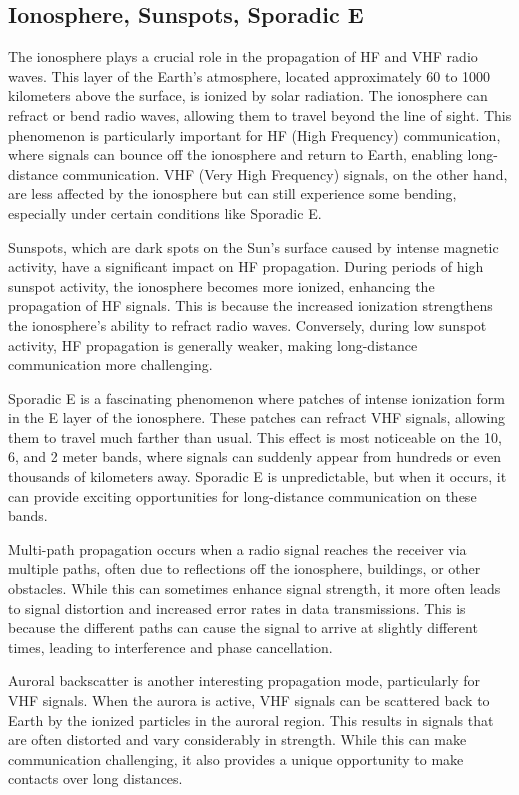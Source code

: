 \subsection{Ionosphere, Sunspots, Sporadic E}
\label{subsec:ionosphere}

The ionosphere plays a crucial role in the propagation of HF and VHF radio waves. This layer of the Earth's atmosphere, located approximately 60 to 1000 kilometers above the surface, is ionized by solar radiation. The ionosphere can refract or bend radio waves, allowing them to travel beyond the line of sight. This phenomenon is particularly important for HF (High Frequency) communication, where signals can bounce off the ionosphere and return to Earth, enabling long-distance communication. VHF (Very High Frequency) signals, on the other hand, are less affected by the ionosphere but can still experience some bending, especially under certain conditions like Sporadic E.

Sunspots, which are dark spots on the Sun's surface caused by intense magnetic activity, have a significant impact on HF propagation. During periods of high sunspot activity, the ionosphere becomes more ionized, enhancing the propagation of HF signals. This is because the increased ionization strengthens the ionosphere's ability to refract radio waves. Conversely, during low sunspot activity, HF propagation is generally weaker, making long-distance communication more challenging.

Sporadic E is a fascinating phenomenon where patches of intense ionization form in the E layer of the ionosphere. These patches can refract VHF signals, allowing them to travel much farther than usual. This effect is most noticeable on the 10, 6, and 2 meter bands, where signals can suddenly appear from hundreds or even thousands of kilometers away. Sporadic E is unpredictable, but when it occurs, it can provide exciting opportunities for long-distance communication on these bands.

Multi-path propagation occurs when a radio signal reaches the receiver via multiple paths, often due to reflections off the ionosphere, buildings, or other obstacles. While this can sometimes enhance signal strength, it more often leads to signal distortion and increased error rates in data transmissions. This is because the different paths can cause the signal to arrive at slightly different times, leading to interference and phase cancellation.

Auroral backscatter is another interesting propagation mode, particularly for VHF signals. When the aurora is active, VHF signals can be scattered back to Earth by the ionized particles in the auroral region. This results in signals that are often distorted and vary considerably in strength. While this can make communication challenging, it also provides a unique opportunity to make contacts over long distances.

